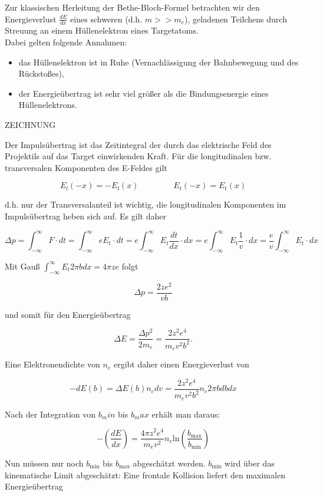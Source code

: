 Zur klassischen Herleitung der Bethe-Bloch-Formel betrachten wir den Energieverlust $\frac{dE}{dx}$
eines schweren (d.h. $m>>m_e$), geladenen Teilchens durch Streuung an einem Hüllenelektron eines
Targetatoms.
\\
Dabei gelten folgende Annahmen:
\begin{itemize}
  \item das Hüllenelektron ist in Ruhe (Vernachlässigung der Bahnbewegung und des Rückstoßes),
  \item der Energieübertrag ist sehr viel größer als die Bindungsenergie eines Hüllenelektrons.
\end{itemize}


{\Huge ZEICHNUNG}

Der Impulsübertrag ist das Zeitintegral der durch das elektrische Feld des Projektils auf das
Target einwirkenden Kraft. Für die longitudinalen bzw. transversalen Komponenten des E-Feldes gilt

\[E_l(-x)=-E_l(x)~~~~~~~~~~~~~~~~~~~E_t(-x)=E_t(x)\]

d.h. nur der Transversalanteil ist wichtig, die longitudinalen Komponenten im Impulsübertrag heben
sich auf. Es gilt daher

\[\Delta p= \int_{-\infty}^{\infty}F\cdot dt = \int_{-\infty}^{\infty}eE_t\cdot dt =
e\int_{-\infty}^{\infty}E_t\frac{dt}{dx}\cdot dx
=e\int_{-\infty}^{\infty}E_t\frac{1}{v}\cdot dx
=\frac{e}{v}\int_{-\infty}^{\infty}E_t\cdot dx\]

Mit Gauß $\int_{-\infty}^{\infty}E_t2\pi bdx=4\pi ze$ folgt

\[\Delta p = \frac{2ze^2}{vb}\]

und somit für den Energieübertrag

\[\Delta E=\frac{\Delta p^2}{2m_e}=\frac{2z^2e^4}{m_ev^2b^2} .\]

Eine Elektronendichte von $n_e$ ergibt daher einen Energieverlust von 

\[-dE(b)=\Delta E(b)n_edv=\frac{2z^2e^4}{m_ev^2b^2}n_e2\pi b db dx\]

Nach der Integration von $b_min$ bis $b_max$ erhält man daraus:

\[-\left(\frac{dE}{dx}\right)=\frac{4\pi z^2
e^4}{m_ev^2}n_e\text{ln}\left(\frac{b_{\text{max}}}{b_{\text{min}}}\right)\]

Nun müssen nur noch $b_{\text{min}}$ bis $b_{\text{max}}$ abgeschätzt werden. $b_{\text{min}}$ wird über das
kinematische Limit abgeschätzt: Eine frontale Kollision liefert den maximalen Energieübertrag

